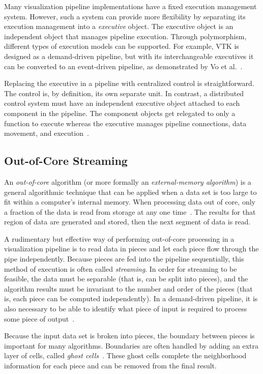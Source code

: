 \documentclass{article}
\newcommand*{\lcite}[1]{~\cite{#1}}
\newcommand*{\scite}[1]{~\cite{#1}}
\newcommand*{\keyterm}[1]{\emph{#1}}
\newcommand{\etal}{et al.}
\begin{document}
Many visualization pipeline implementations have a fixed execution
management system.  However, such a system can provide more flexibility by
separating its execution management into a \keyterm{executive} object.  The
executive object is an independent object that manages pipeline execution.
Through polymorphism, different types of execution models can be
supported.  For example, VTK is designed as a demand-driven pipeline, but
with its interchangeable executives it can be converted to an event-driven
pipeline, as demonstrated by Vo \etal\scite{Vo2010}.

Replacing the executive in a pipeline with centralized control is
straightforward.  The control is, by definition, its own separate unit.  In
contrast, a distributed control system must have an independent executive
object attached to each component in the pipeline.  The component objects
get relegated to only a function to execute whereas the executive manages
pipeline connections, data movement, and execution\lcite{VTKUsersGuide}.

\subsection{Out-of-Core Streaming}
\label{sec:OutOfCore}

An \keyterm{out-of-core} algorithm (or more formally an
\keyterm{external-memory algorithm}) is a general algorithmic technique
that can be applied when a data set is too large to fit within a computer's
internal memory.  When processing data out of core, only a fraction of the
data is read from storage at any one time\lcite{Vitter2001}.  The results
for that region of data are generated and stored, then the next segment of
data is read.

A rudimentary but effective way of performing out-of-core processing in a
visualization pipeline is to read data in pieces and let each piece flow
through the pipe independently.  Because pieces are fed into the pipeline
sequentially, this method of execution is often called \keyterm{streaming}.
In order for streaming to be feasible, the data must be separable (that is,
can be split into pieces), and the algorithm results must be invariant to
the number and order of the pieces (that is, each piece can be computed
independently).  In a demand-driven pipeline, it is also necessary to be
able to identify what piece of input is required to process some piece of
output\lcite{Law1999}.

Because the input data set is broken into pieces, the boundary between
pieces is important for many algorithms.  Boundaries are often handled by
adding an extra layer of cells, called \keyterm{ghost
  cells}\lcite{Ahrens2001}.  These ghost cells complete the neighborhood
information for each piece and can be removed from the final result.
\end{document}
